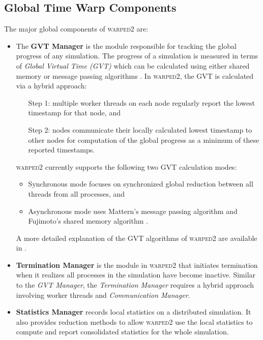 \documentclass[11pt]{book}
\begin{document}
\subsection{Global Time Warp Components}\label{subsec:global_componenets}

The major global components of \textsc{warped2} are:

\begin{itemize}

\item The \textbf{GVT Manager} is the module responsible for tracking the global progress of any simulation.
  The progress of a simulation is measured in terms of \emph{Global Virtual Time (GVT)} which can be
  calculated using either shared memory or message passing algorithms
  \cite{mattern-93,bellenot-90,fujimoto-94}.  In \textsc{warped2}, the GVT is calculated via a hybrid
  approach:

  \begin{enumerate}

  \item [Step 1:] multiple worker threads on each node regularly report the lowest timestamp for that node,
    and

  \item [Step 2:] nodes communicate their locally calculated lowest timestamp to other nodes for computation
    of the global progress as a minimum of these reported timestamps.

  \end{enumerate}
    
  \noindent
  \textsc{warped2} currently supports the following two GVT calculation modes:

  \begin{itemize}
  \item Synchronous \cite{fujimoto-94} mode focuses on synchronized global reduction between all threads from
    all processes, and 
  \item Asynchronous \cite{mattern-93} mode uses Mattern's message passing algorithm \cite{mattern-93} and
    Fujimoto's shared memory algorithm \cite{fujimoto-94}.
  \end{itemize}

  \noindent
  A more detailed explanation of the GVT algorithms of \textsc{warped2} are available in \cite{weber-16}.

\item \textbf{Termination Manager} is the module in \textsc{warped2} that initiates termination when it
  realizes all processes in the simulation have become inactive.  Similar to the \emph{GVT Manager}, the
  \emph{Termination Manager} requires a hybrid approach involving worker threads and \emph{Communication
    Manager}.

\item \textbf{Statistics Manager} records local statistics on a distributed simulation.  It also provides
  reduction methods to allow \textsc{warped2} use the local statistics to compute and report consolidated
  statistics for the whole simulation.

\end{itemize}
\end{document}
